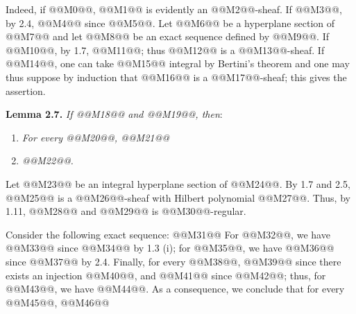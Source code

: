 Indeed, if @@M0@@, @@M1@@ is evidently an @@M2@@-sheaf. If @@M3@@, by 2.4, @@M4@@ since @@M5@@. Let @@M6@@ be a hyperplane section of @@M7@@ and let @@M8@@ be an exact sequence defined by @@M9@@. If @@M10@@, by 1.7, @@M11@@; thus @@M12@@ is a @@M13@@-sheaf. If @@M14@@, one can take @@M15@@ integral by Bertini's theorem and one may thus suppose by induction that @@M16@@ is a @@M17@@-sheaf; this gives the assertion.

\textbf{Lemma 2.7.} \emph{If @@M18@@ and @@M19@@, then}:
\begin{enumerate}[label=(\roman*)]
\item \emph{For every @@M20@@, @@M21@@}
\item \emph{@@M22@@.}
\end{enumerate}

Let @@M23@@ be an integral hyperplane section of @@M24@@. By 1.7 and 2.5, @@M25@@ is a @@M26@@-sheaf with Hilbert polynomial @@M27@@. Thus, by 1.11, @@M28@@ and @@M29@@ is @@M30@@-regular.

Consider the following exact sequence:
@@M31@@
For @@M32@@, we have @@M33@@ since @@M34@@ by 1.3 (i); for @@M35@@, we have @@M36@@ since @@M37@@ by 2.4. Finally, for every @@M38@@, @@M39@@ since there exists an injection @@M40@@, and @@M41@@ since @@M42@@; thus, for @@M43@@, we have @@M44@@. As a consequence, we conclude that for every @@M45@@,
@@M46@@

